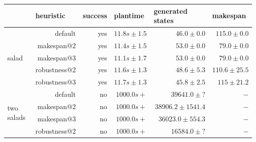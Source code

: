 \begin{table}[]
  \begin{tabular}{p{1.5cm}rrrrr}
  \multicolumn{1}{l}{}         & \multicolumn{1}{l}{heuristic} & success & \multicolumn{1}{l}{plantime} & \multicolumn{1}{l}{generated states} & \multicolumn{1}{l}{makespan} \\ \hline \hline
  \multirow{5}{*}{salad}        & default                       & yes     & $11.8s\pm1.5 $              & $46.0\pm0.0$                         & $115.0 \pm0.0$               \\ 
                                & makespan@2                    & yes     & $11.4s\pm1.5 $              & $53.0\pm0.0$                         & $79.0  \pm0.0$               \\ 
                                & makespan@3                    & yes     & $11.1s\pm1.7 $              & $53.0\pm0.0$                         & $79.0  \pm0.0$               \\
                                & robustness@2                  & yes     & $11.6s\pm1.3 $              & $48.6\pm5.3$                         & $110.6 \pm25.5$               \\ 
                                & robustness@3                  & yes     & $11.7s\pm1.3 $              & $45.8\pm2.5$                         & $115 \pm21.2$               \\\hline
  \multirow{5}{*}{\parbox{1.2cm}{two salads}}   
                                & default                       & no      & $1000.0s+$                  & $39641.0\pm?$                        & $-     $                     \\
                                & makespan@2                    & no      & $1000.0s+$                  & $38906.2\pm1541.4$                   & $-     $                     \\
                                & makespan@3                    & no      & $1000.0s+$                  & $36023.0\pm554.3$                    & $-     $                     \\
                                & robustness@2                  & no      & $1000.0s+$                  & $16584.0\pm?$                        & $-     $                     \\ 

\end{tabular}
\end{table}
